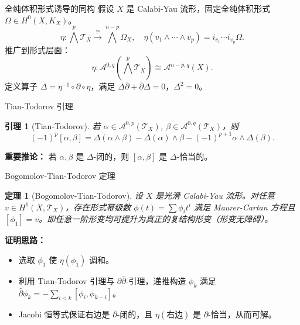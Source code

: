 \documentclass{beamer}
\theoremstyle{definition}
\theoremstyle{plain}
\newtheorem{thm}[defn]{定理}
\newtheorem{lem}[defn]{引理}
\begin{document}
\begin{frame}{全纯体积形式诱导的同构}
假设 $X$ 是 Calabi-Yau 流形，固定全纯体积形式 $\Omega\in H^0(X,K_X)$。
\[
\eta:\bigwedge^p \mathcal{T}_X \xrightarrow{\cong} \bigwedge^{n-p}\Omega_X,\quad
\eta(v_1\wedge\cdots\wedge v_p)=i_{v_1}\cdots i_{v_p}\Omega.
\]
推广到形式层面：
\[
\eta:\mathcal{A}^{0,q}(\bigwedge^p \mathcal{T}_X)\cong\mathcal{A}^{n-p,q}(X).
\]
定义算子 $\Delta = \eta^{-1}\circ\partial\circ\eta$，满足 $\Delta\bar\partial+\bar\partial\Delta=0$，$\Delta^2=0$。
\end{frame}

\begin{frame}{Tian-Todorov 引理}
\begin{lem}[Tian-Todorov\cite{Tian,TT89}]
若 $\alpha\in\mathcal{A}^{0,p}(\mathcal{T}_X)$, $\beta\in\mathcal{A}^{0,q}(\mathcal{T}_X)$，则
\[
(-1)^p[\alpha,\beta] = \Delta(\alpha\wedge\beta) - \Delta(\alpha)\wedge\beta - (-1)^{p+1}\alpha\wedge\Delta(\beta).
\]
\end{lem}
\vspace{-5pt}
\textbf{重要推论：} 若 $\alpha,\beta$ 是 $\Delta$-闭的，则 $[\alpha,\beta]$ 是 $\Delta$-恰当的。
\end{frame}

\begin{frame}{Bogomolov-Tian-Todorov 定理}
\begin{thm}[Bogomolov-Tian-Todorov\cite{Tian,TT89}]
设 $X$ 是光滑 Calabi-Yau 流形。对任意 $v\in H^1(X,\mathcal{T}_X)$，存在形式幂级数 $\phi(t)=\sum \phi_i t^i$ 满足 Maurer-Cartan 方程且 $[\phi_1]=v$。即任意一阶形变均可提升为真正的复结构形变（形变无障碍）。
\end{thm}
\vspace{-5pt}
\textbf{证明思路：}
\begin{itemize}
    \item 选取 $\phi_1$ 使 $\eta(\phi_1)$ 调和。
    \item 利用 Tian-Todorov 引理与 $\partial\bar\partial$-引理，递推构造 $\phi_k$ 满足 $\bar\partial\phi_k = -\sum_{i<k}[\phi_i,\phi_{k-i}]$。
    \item Jacobi 恒等式保证右边是 $\bar\partial$-闭的，且 $\eta(\text{右边})$ 是 $\partial$-恰当，从而可解。
\end{itemize}
\end{frame}
\end{document}

